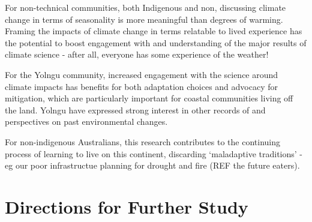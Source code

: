For non-technical communities, both Indigenous and non, discussing climate
change in terms of seasonality is more meaningful than degrees of warming.
Framing the impacts of climate change in terms relatable to lived experience
has the potential to boost engagement with and understanding of the major
results of climate science - after all, everyone has some experience of the
weather!

For the Yolngu community, increased engagement with the science around climate
impacts has benefits for both adaptation choices and advocacy for mitigation,
which are particularly important for coastal communities living off the land.
Yolngu have expressed strong interest in other records of and perspectives on
past environmental changes.

For non-indigenous Australians, this research contributes to the continuing
process of learning to live on this continent, discarding `maladaptive traditions'
- eg our poor infrastructue planning for drought and fire (REF the future eaters).



\section{Directions for Further Study}
\label{sec:further-study}

